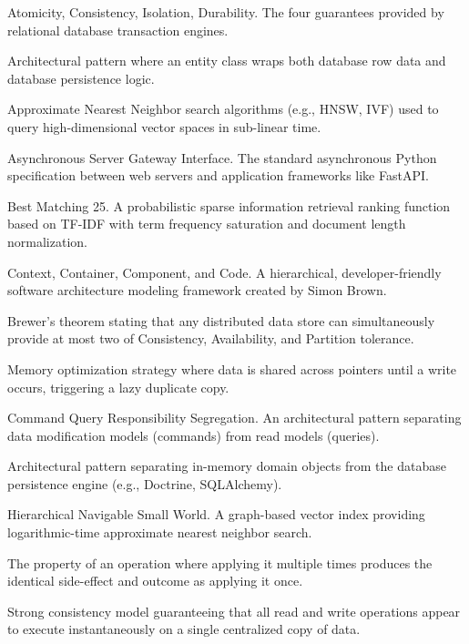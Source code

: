 \documentclass[11pt,oneside]{book}
\begin{document}
\begin{description}[leftmargin=2.5cm,style=nextline]
  \item[ACID] Atomicity, Consistency, Isolation, Durability. The four guarantees provided by relational database transaction engines.
  \item[Active Record] Architectural pattern where an entity class wraps both database row data and database persistence logic.
  \item[ANN] Approximate Nearest Neighbor search algorithms (e.g., HNSW, IVF) used to query high-dimensional vector spaces in sub-linear time.
  \item[ASGI] Asynchronous Server Gateway Interface. The standard asynchronous Python specification between web servers and application frameworks like FastAPI.
  \item[BM25] Best Matching 25. A probabilistic sparse information retrieval ranking function based on TF-IDF with term frequency saturation and document length normalization.
  \item[C4 Model] Context, Container, Component, and Code. A hierarchical, developer-friendly software architecture modeling framework created by Simon Brown.
  \item[CAP Theorem] Brewer's theorem stating that any distributed data store can simultaneously provide at most two of Consistency, Availability, and Partition tolerance.
  \item[Copy-on-Write (CoW)] Memory optimization strategy where data is shared across pointers until a write occurs, triggering a lazy duplicate copy.
  \item[CQRS] Command Query Responsibility Segregation. An architectural pattern separating data modification models (commands) from read models (queries).
  \item[Data Mapper] Architectural pattern separating in-memory domain objects from the database persistence engine (e.g., Doctrine, SQLAlchemy).
  \item[HNSW] Hierarchical Navigable Small World. A graph-based vector index providing logarithmic-time approximate nearest neighbor search.
  \item[Idempotency] The property of an operation where applying it multiple times produces the identical side-effect and outcome as applying it once.
  \item[Linearizability] Strong consistency model guaranteeing that all read and write operations appear to execute instantaneously on a single centralized copy of data.

\end{description}
\end{document}
